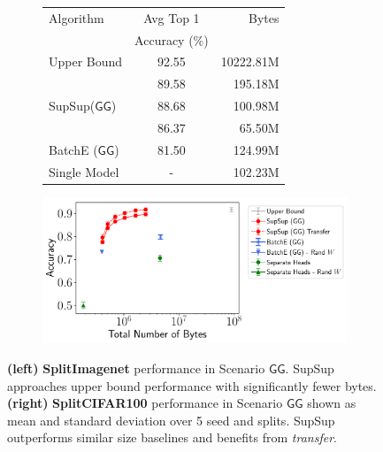 \documentclass{article}
\newcommand{\ac}{SupSup\xspace}
\newcommand{\casename}[1]{\ensuremath{\mathsf{#1}}\xspace}
\begin{document}
\begin{figure}[t]
\begin{subfigure}{.46\textwidth}
\small
\vspace{-1.9em}
\begin{tabular}{lcr}
\toprule
          Algorithm &  Avg Top 1 &   Bytes \\
                 &  Accuracy (\%) &    \\
\midrule
                   Upper Bound &               92.55 &  10222.81M\\\midrule
  &               89.58 &    195.18M \\
\ac (\casename{GG}) &               88.68 &    100.98M \\
  &               86.37 &     65.50M \\\midrule
BatchE ($\ensuremath{\mathsf{GG}}$) &               81.50 &    124.99M \\
Single Model & - & 102.23M\\
\bottomrule
\end{tabular}
    \label{tab:splitimagenet}
\end{subfigure}
\begin{subfigure}{.54\textwidth}
    \centering
    \includegraphics[width=\textwidth]{figs/splitcifar100_full.pdf}
    \label{fig:splitcifar}
    \end{subfigure}
    \vspace{-1.2em}
    \caption{\textbf{(left)} \textbf{SplitImagenet} performance in Scenario \casename{GG}. \ac approaches upper bound performance with significantly fewer bytes. \textbf{(right)} \textbf{SplitCIFAR100} performance in Scenario \casename{GG} shown as mean and standard deviation over 5 seed and splits. \ac outperforms similar size baselines and benefits from \textit{transfer}.}
    \vspace{-1.2em}
    \label{fig:t1}
\end{figure}
\end{document}
